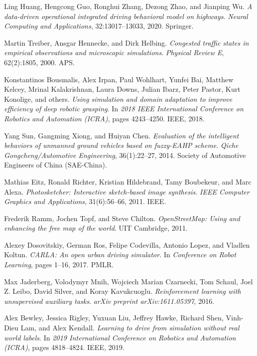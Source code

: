 \documentclass[lettersize,journal]{IEEEtran}
\begin{document}
\begin{thebibliography}{1}
Ling Huang, Hengcong Guo, Ronghui Zhang, Dezong Zhao, and Jianping Wu.
\newblock \emph{A data-driven operational integrated driving behavioral model on highways}.
\newblock \emph{Neural Computing and Applications}, 32:13017--13033, 2020. Springer.

Martin Treiber, Ansgar Hennecke, and Dirk Helbing.
\newblock \emph{Congested traffic states in empirical observations and microscopic simulations}.
\newblock \emph{Physical Review E}, 62(2):1805, 2000. APS.


Konstantinos Bousmalis, Alex Irpan, Paul Wohlhart, Yunfei Bai, Matthew Kelcey, Mrinal Kalakrishnan, Laura Downs, Julian Ibarz, Peter Pastor, Kurt Konolige, and others.
\newblock \emph{Using simulation and domain adaptation to improve efficiency of deep robotic grasping}.
\newblock In \emph{2018 IEEE International Conference on Robotics and Automation (ICRA)}, pages 4243--4250. IEEE, 2018.

Yang Sun, Gangming Xiong, and Huiyan Chen.
\newblock \emph{Evaluation of the intelligent behaviors of unmanned ground vehicles based on fuzzy-EAHP scheme}.
\newblock \emph{Qiche Gongcheng/Automotive Engineering}, 36(1):22--27, 2014. Society of Automotive Engineers of China (SAE-China).

Mathias Eitz, Ronald Richter, Kristian Hildebrand, Tamy Boubekeur, and Marc Alexa.
\newblock \emph{Photosketcher: Interactive sketch-based image synthesis}.
\newblock \emph{IEEE Computer Graphics and Applications}, 31(6):56--66, 2011. IEEE.

Frederik Ramm, Jochen Topf, and Steve Chilton.
\newblock \emph{OpenStreetMap: Using and enhancing the free map of the world}.
\newblock UIT Cambridge, 2011.

Alexey Dosovitskiy, German Ros, Felipe Codevilla, Antonio Lopez, and Vladlen Koltun.
\newblock \emph{CARLA: An open urban driving simulator}.
\newblock In \emph{Conference on Robot Learning}, pages 1--16, 2017. PMLR.

Max Jaderberg, Volodymyr Mnih, Wojciech Marian Czarnecki, Tom Schaul, Joel Z. Leibo, David Silver, and Koray Kavukcuoglu.
\newblock \emph{Reinforcement learning with unsupervised auxiliary tasks}.
\newblock \emph{arXiv preprint arXiv:1611.05397}, 2016.

Alex Bewley, Jessica Rigley, Yuxuan Liu, Jeffrey Hawke, Richard Shen, Vinh-Dieu Lam, and Alex Kendall.
\newblock \emph{Learning to drive from simulation without real world labels}.
\newblock In \emph{2019 International Conference on Robotics and Automation (ICRA)}, pages 4818--4824. IEEE, 2019.


\end{thebibliography}
\end{document}
